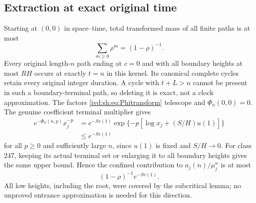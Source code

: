 \documentclass[11pt,letterpaper]{article}
\theoremstyle{remark}\newtheorem{remark}[theorem]{Remark}
\numberwithin{equation}{section}
\begin{document}
\subsection{Extraction at exact original time}
Starting at $(0,0)$ in space--time, total transformed mass of all
finite paths is at most
\begin{equation}\label{ivd:sh:eq:geometricmass}
 \sum_{m\ge0}\rho^m=(1-\rho)^{-1}.
\end{equation}
Every original length-$n$ path ending at $c=0$ and with all boundary
heights at most $RH$ occurs at exactly $t=n$ in this kernel.
Its canonical complete cycles retain every original integer duration.
A cycle with $t+L>n$ cannot be present in such a boundary-terminal
path, so deleting it is exact, not a clock approximation.
The factors \eqref{ivd:sh:eq:Phitransform} telescope and $\Phi_n(0,0)=0$.
The genuine coefficient terminal multiplier gives
\begin{align}\label{ivd:sh:eq:endpointfactor}
 e^{-\Phi_n(n,p)}x_j^{-p}
  &=e^{-Sv(1)}\exp\{-p[\log x_j+(S/H)u(1)]\}\\
  &\le e^{-Sv(1)}\nonumber
\end{align}
for all $p\ge0$ and sufficiently large $n$, since $u(1)$ is fixed
and $S/H\to0$. For class 247, keeping its actual terminal set or
enlarging it to all boundary heights gives the same upper bound.
Hence the confined contribution to $a_j(n)/\mu_j^n$ is at most
\begin{equation}\label{ivd:sh:eq:confined}
 (1-\rho)^{-1}e^{-Sv(1)}.
\end{equation}
All low heights, including the root, were covered by the subcritical
lemma; no unproved entrance approximation is needed for this direction.
\end{document}

